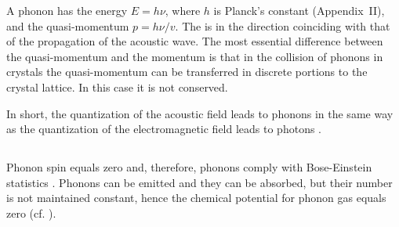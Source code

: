 A phonon has the energy $E = h\nu$, where $h$ is Planck's constant (Appendix~II), and the quasi-momentum $p = h\nu /v$. The  is in the direction coinciding with that of the propagation of the acoustic wave. The most essential difference between the quasi-momentum and the momentum is that in the collision of phonons in crystals the quasi-momentum can be transferred in discrete portions to the crystal lattice. In this case it is not conserved. 

In short, the quantization of the acoustic field leads to phonons in the same way as the quantization of the electromagnetic field leads to photons .

\subsection{}\label{41.7.6} Phonon spin equals zero and, therefore, phonons comply with Bose-Einstein statistics . Phonons can be emitted and they can be absorbed, but their number is not maintained constant, hence the chemical potential for phonon gas 
equals zero (cf. ). 

